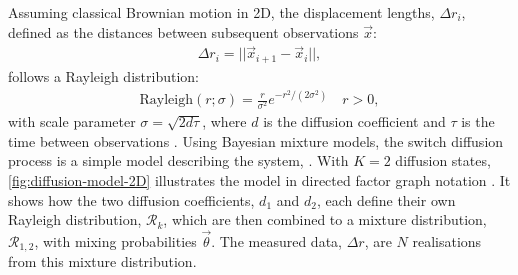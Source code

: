 Assuming classical Brownian motion in 2D, the displacement lengths, $\Delta r_i$, defined as the distances between subsequent observations $\vec{x}$:
\begin{align}
    \Delta r_i = || \vec{x}_{i+1} - \vec{x}_{i} ||,
\end{align}
follows a Rayleigh distribution:
\begin{align}
    \mathrm{Rayleigh}(r; \sigma) =\frac{r}{\sigma^2} e^{-r^2/(2\sigma^2)} \quad r>0,
\end{align}
with scale parameter $\sigma = \sqrt{2d\tau}$, where $d$ is the diffusion coefficient and $\tau$ is the time between observations \autocite{andersonTrackingCellSurface1992}
. Using Bayesian mixture models, the switch diffusion process is a simple model describing the system, \autocite{bakerInferenceDiffusionCoefficients2021}. With $K=2$ diffusion states, \autoref{fig:diffusion-model-2D} illustrates the model in directed factor graph notation \autocite{dietzDirectedFactorGraph2022}. It shows how the two diffusion coefficients, $d_1$ and $d_2$, each define their own Rayleigh distribution, $\mathcal{R}_k$, which are then combined to a mixture distribution, $\mathcal{R}_{1,2}$, with mixing probabilities $\vec{\theta}$. The measured data, $\Delta r$, are $N$ realisations from this mixture distribution.


\begin{figure}[htbp]
    \centering
\end{figure}


